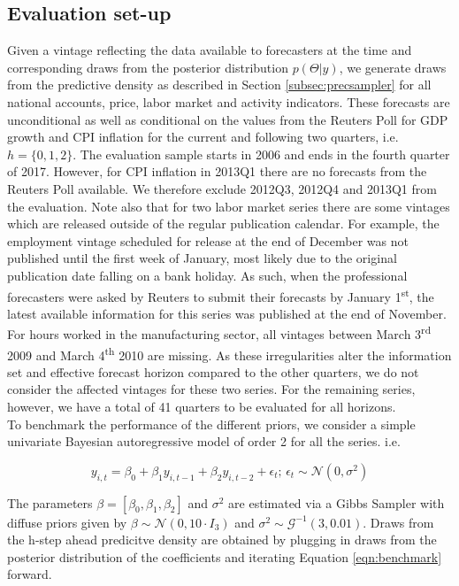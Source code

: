 \documentclass[notitlepage,a4paper,12pt]{article}
\begin{document}
\subsection{Evaluation set-up}

Given a vintage reflecting the data available to forecasters at the time and corresponding draws from the posterior distribution $p(\Theta|y)$, we generate draws from the predictive density as described in Section \ref{subsec:precsampler} for all national accounts, price, labor market and activity indicators. These forecasts are unconditional as well as conditional on the values from the Reuters Poll for GDP growth and CPI inflation for the current and following two quarters, i.e. $h=\{0, 1, 2\}$. The evaluation sample starts in 2006 and ends in the fourth quarter of 2017. However, for CPI inflation in 2013Q1 there are no forecasts from the Reuters Poll available. We therefore exclude 2012Q3, 2012Q4 and 2013Q1 from the evaluation. Note also that for two labor market series there are some vintages which are released outside of the regular publication calendar. For example, the employment vintage scheduled for release at the end of December was not published until the first week of January, most likely due to the original publication date falling on a bank holiday. As such, when the professional forecasters were asked by Reuters to submit their forecasts by January 1\textsuperscript{st}, the latest available information for this series was published at the end of November. For hours worked in the manufacturing sector, all vintages between March 3\textsuperscript{rd} 2009 and March 4\textsuperscript{th} 2010 are missing. As these irregularities alter the information set and effective forecast horizon compared to the other quarters, we do not consider the affected vintages for these two series. For the remaining series, however, we have a total of 41 quarters to be evaluated for all horizons.\\

To benchmark the performance of the different priors, we consider a simple univariate Bayesian autoregressive model of order 2 for all the series.  i.e. 

\begin{equation}\label{eqn:benchmark}
y_{i,t} = \beta_0 + \beta_1 y_{i,t-1} + \beta_2 y_{i,t-2} + \epsilon_t; \, \epsilon_t \sim \mathcal{N}(0, \sigma^2)
\end{equation}

The parameters $\beta = [\beta_0, \beta_1, \beta_2]$  and $\sigma^2$ are estimated via a Gibbs Sampler with diffuse priors given by $\beta \sim \mathcal{N}(0,10 \cdot I_3)$  and $\sigma^2 \sim \mathcal{G}^{-1}(3,0.01)$. Draws from the h-step ahead predicitve density are obtained by plugging in draws from the posterior distribution of the coefficients and iterating Equation \ref{eqn:benchmark} forward.\\
\end{document}
